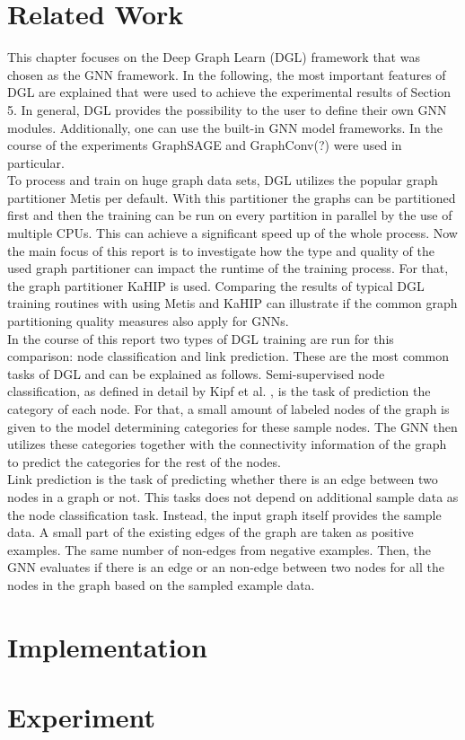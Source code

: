 \documentclass[acmsmall,nonacm,screen,review]{acmart}
\begin{document}
\section{Related Work}
This chapter focuses on the Deep Graph Learn (DGL) framework \cite{DGL} that was chosen as the GNN framework. In the following, the most important features of DGL are explained that were used to achieve the experimental results of Section 5. In general, DGL provides the possibility to the user to define their own GNN modules. Additionally, one can use the built-in GNN model frameworks. In the course of the experiments GraphSAGE \cite{GraphSAGE} and GraphConv(?) \cite{NC} were used in particular. \\
To process and train on huge graph data sets, DGL utilizes the popular graph partitioner Metis \cite{Metis} per default. With this partitioner the graphs can be partitioned first and then the training can be run on every partition in parallel by the use of multiple CPUs. This can achieve a significant speed up of the whole process. Now the main focus of this report is to investigate how the type and quality of the used graph partitioner can impact the runtime of the training process. For that, the graph partitioner KaHIP \cite{KaHIP} is used. Comparing the results of typical DGL training routines with using Metis and KaHIP can illustrate if the common graph partitioning quality measures also apply for GNNs. \\
In the course of this report two types of DGL training are run for this comparison: node classification and link prediction. These are the most common tasks of DGL and can be explained as follows. Semi-supervised node classification, as defined in detail by Kipf et al. \cite{NC}, is the task of prediction the category of each node. For that, a small amount of labeled nodes of the graph is given to the model determining categories for these sample nodes. The GNN then utilizes these categories together with the connectivity information of the graph to predict the categories for the rest of the nodes. \\%
Link prediction is the task of predicting whether there is an edge between two nodes in a graph or not. This tasks does not depend on additional sample data as the node classification task. Instead, the input graph itself provides the sample data. A small part of the existing edges of the graph are taken as positive examples. The same number of non-edges from negative examples. Then, the GNN evaluates if there is an edge or an non-edge between two nodes for all the nodes in the graph based on the sampled example data.
\section{Implementation}

\section{Experiment}



\end{document}
